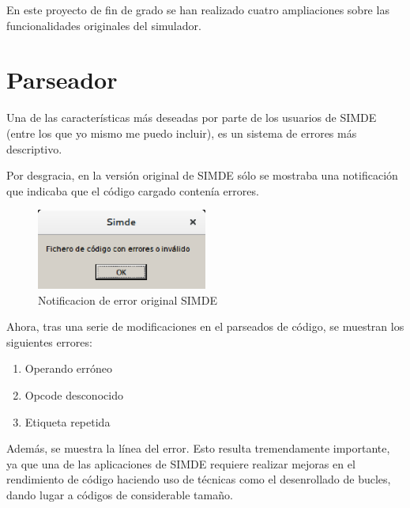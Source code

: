 

En este proyecto de fin de grado se han realizado cuatro ampliaciones sobre las funcionalidades originales 
del simulador. 


\section{Parseador}
\label{6:sec1}

Una de las características más deseadas por parte de los usuarios de SIMDE 
(entre los que yo mismo me puedo incluir), es un sistema de errores más descriptivo. 

Por desgracia, en la versión original de SIMDE sólo se mostraba una notificación que indicaba
que el código cargado contenía errores.

\begin{figure}[!th]
\begin{center}
\includegraphics[width=0.5\textwidth]{images/cap6/errorsimde.eps}
\caption{Notificacion de error original SIMDE}
\end{center}
\end{figure}

Ahora, tras una serie de modificaciones en el parseados de código, se muestran los siguientes errores:

\begin{enumerate}
\item Operando erróneo
\item Opcode desconocido
\item Etiqueta repetida
\end{enumerate}

Además, se muestra la línea del error. Esto resulta tremendamente importante, 
ya que una de las aplicaciones de SIMDE requiere realizar mejoras en el rendimiento
de código haciendo uso de técnicas como el desenrollado de bucles, 
dando lugar a códigos de considerable tamaño.


